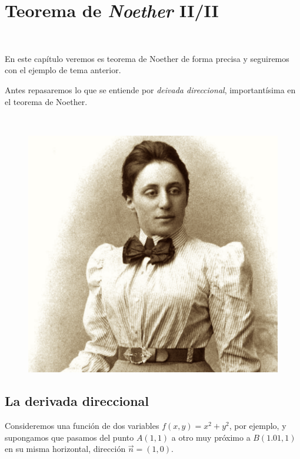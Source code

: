 \chapter{Teorema de \emph{Noether} II/II}
\label{NoetherIIdeII}




\vspace{10mm}
\begin{adjustwidth}{50pt}{50pt}
\begin{ejemplo}
\begin{multicols}{2}

$\,$

En este capítulo veremos es teorema de Noether de forma precisa y seguiremos con el ejemplo de tema anterior. 

Antes repasaremos lo que se entiende por \emph{deivada direccional}, importantísima en el teorema de Noether.

$\,$
\begin{figure}[H]
	\centering
	\includegraphics[width=.4\textwidth]{imagenes/img14-01.png}
\end{figure}

\end{multicols}
\end{ejemplo}
\end{adjustwidth}
\vspace{5mm}

\section{La derivada direccional}

Consideremos una función de dos variables $f(x,y)=x^2+y^2$, por ejemplo, y supongamos que pasamos del punto $A(1,1)$ a otro muy próximo a $B(1.01,1)$ en su misma horizontal, dirección $\vec n=(1,0)$. 

